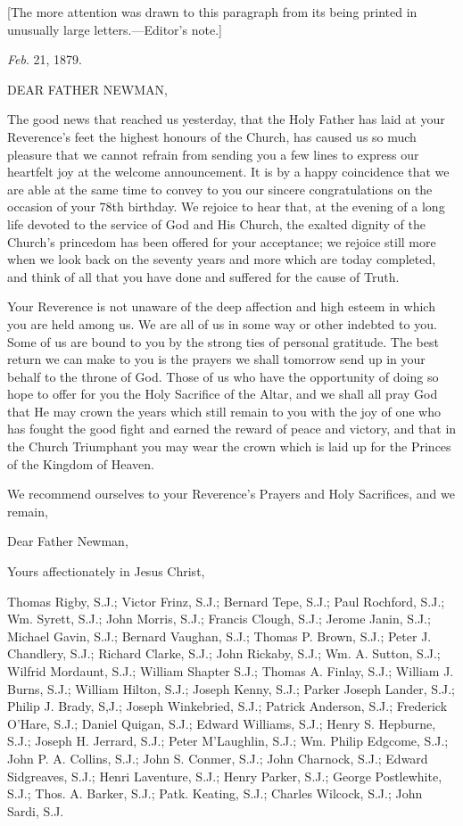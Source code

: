 [The more attention was drawn to this paragraph from its being
printed in unusually large letters.—Editor's note.]



\emph{Feb}. 21, 1879.

DEAR FATHER NEWMAN,

The good news that reached us yesterday, that the Holy Father has laid
at your Reverence's feet the highest honours of the Church, has
caused us so much pleasure that we cannot refrain from sending you a
few lines to express our heartfelt joy at the welcome announcement. It
is by a happy coincidence that we are able at the same time to convey
to you our sincere congratulations on the occasion of your 78th
birthday. We rejoice to hear that, at the evening of a long life
devoted to the service of God and His Church, the exalted dignity of
the Church's princedom has been offered for your acceptance; we
rejoice still more when we look back on the seventy years and more
which are today completed, and think of all that you have done and
suffered for the cause of Truth.

Your Reverence is not unaware of the deep affection and high esteem
in which you are held among us. We are all of us in some way or other
indebted to you. Some of us are bound to you by the strong ties of
personal gratitude. The best return we can make to you is the prayers
we shall tomorrow send up in your behalf to the throne of God. Those
of us who have the opportunity of doing so hope to offer for you the
Holy Sacrifice of the Altar, and we shall all pray God that He may
crown the years which still remain to you with the joy of one who has
fought the good fight and earned the reward of peace and victory, and
that in the Church Triumphant you may wear the crown which is laid
up for the Princes of the Kingdom of Heaven.

We recommend ourselves to your Reverence's Prayers and Holy
Sacrifices, and we remain,

Dear Father Newman,

Yours affectionately in Jesus Christ,

Thomas Rigby, S.J.; Victor Frinz, S.J.; Bernard Tepe,
S.J.; Paul Rochford, S.J.; Wm. Syrett, S.J.; John Morris, S.J.;
Francis Clough, S.J.; Jerome Janin, S.J.; Michael Gavin, S.J.; Bernard
Vaughan, S.J.; Thomas P. Brown, S.J.; Peter J. Chandlery, S.J.;
Richard Clarke, S.J.; John Rickaby, S.J.; Wm. A. Sutton, S.J.; Wilfrid
Mordaunt, S.J.; William Shapter S.J.; Thomas A. Finlay, S.J.; William
J. Burns, S.J.; William Hilton, S.J.; Joseph Kenny, S.J.; Parker
Joseph Lander, S.J.; Philip J. Brady, S,J.; Joseph Winkebried, S.J.;
Patrick Anderson, S.J.; Frederick O'Hare, S.J.; Daniel Quigan, S.J.;
Edward Williams, S.J.; Henry S. Hepburne, S.J.; Joseph H. Jerrard, S.J.;
Peter M'Laughlin, S.J.; Wm. Philip Edgcome, S.J.; John P. A. Collins,
S.J.; John S. Conmer, S.J.; John Charnock, S.J.; Edward Sidgreaves,
S.J.; Henri Laventure, S.J.; Henry Parker, S.J.; George Postlewhite,
S.J.; Thos. A. Barker, S.J.; Patk. Keating, S.J.; Charles Wilcock, S.J.;
John Sardi, S.J.

